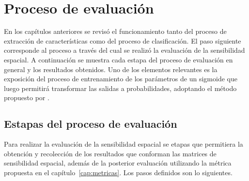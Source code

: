 
\chapter{Proceso de evaluación}
\label{cap:eval}

En los capítulos anteriores se revisó el funcionamiento tanto del proceso de extracción de características como del proceso de clasificación. El paso siguiente corresponde al proceso a través del cual se realizó la evaluación de la sensibilidad espacial. A continuación se muestra cada estapa del proceso de evaluación en general y los resultados obtenidos. Uno de los elementos relevantes es la exposición del proceso de entrenamiento de los parámetros de un sigmoide que luego permitirá transformar las salidas a probabilidades, adoptando el método propuesto por \cite{Platt1999}.

\section{Estapas del proceso de evaluación}
\label{eval:metodologia}

Para realizar la evaluación de la sensibilidad espacial se  etapas que permitiera la obtención y recolección de los resultados que conforman las matrices de sensibilidad espacial, además de la posterior evaluación utilizando la métrica propuesta en el capítulo~\ref{cap:metricas}. Los  pasos definidos son lo siguientes.

